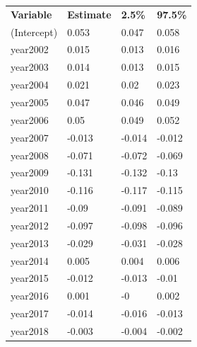 \documentclass{article}
\begin{document}
\begin{table}[]

\small

\begin{tabular}{llll}
\textbf{Variable}                 & \textbf{Estimate} & \textbf{2.5\%} & \textbf{97.5\%} \\
(Intercept)                       & 0.053             & 0.047          & 0.058           \\
year2002                          & 0.015             & 0.013          & 0.016           \\
year2003                          & 0.014             & 0.013          & 0.015           \\
year2004                          & 0.021             & 0.02           & 0.023           \\
year2005                          & 0.047             & 0.046          & 0.049           \\
year2006                          & 0.05              & 0.049          & 0.052           \\
year2007                          & -0.013            & -0.014         & -0.012          \\
year2008                          & -0.071            & -0.072         & -0.069          \\
year2009                          & -0.131            & -0.132         & -0.13           \\
year2010                          & -0.116            & -0.117         & -0.115          \\
year2011                          & -0.09             & -0.091         & -0.089          \\
year2012                          & -0.097            & -0.098         & -0.096          \\
year2013                          & -0.029            & -0.031         & -0.028          \\
year2014                          & 0.005             & 0.004          & 0.006           \\
year2015                          & -0.012            & -0.013         & -0.01           \\
year2016                          & 0.001             & -0             & 0.002           \\
year2017                          & -0.014            & -0.016         & -0.013          \\
year2018                          & -0.003            & -0.004         & -0.002          \\

\end{tabular}
\end{table}
\end{document}
